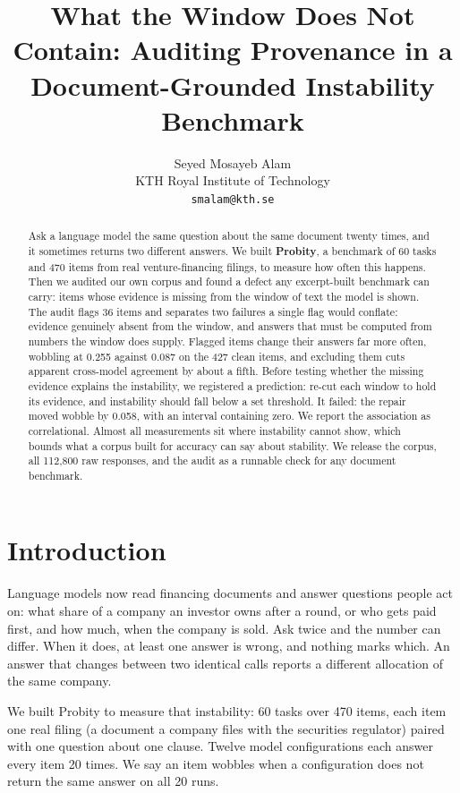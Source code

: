 \documentclass[11pt]{article}
\title{What the Window Does Not Contain: Auditing Provenance in a\\Document-Grounded Instability Benchmark}
\author{Seyed Mosayeb Alam \\
  KTH Royal Institute of Technology \\
  \texttt{smalam@kth.se}}
\begin{document}
\maketitle

\begin{abstract}
Ask a language model the same question about the same document twenty times, and it sometimes
returns two different answers. We built \textbf{Probity}, a benchmark of 60 tasks and 470 items from
real venture-financing filings, to measure how often this happens. Then we audited our own corpus
and found a defect any excerpt-built benchmark can carry: items whose evidence is missing from the
window of text the model is shown. The audit flags 36 items and separates two failures a single
flag would conflate: evidence genuinely absent from the window, and answers that must be computed
from numbers the window does supply. Flagged items change their answers far more often, wobbling at
0.255 against 0.087 on the 427 clean items, and excluding them cuts apparent cross-model agreement
by about a fifth. Before testing whether the missing evidence explains the instability, we
registered a prediction: re-cut each window to hold its evidence, and instability should fall below
a set threshold. It failed: the repair moved wobble by 0.058, with an interval containing zero. We
report the association as correlational. Almost all measurements sit where instability cannot show, which
bounds what a corpus built for accuracy can say about stability. We release the corpus, all
112{,}800 raw responses, and the audit as a runnable check for any document benchmark.
\end{abstract}

\section{Introduction}

Language models now read financing documents and answer questions people act on: what share of a
company an investor owns after a round, or who gets paid first, and how much, when the company is
sold. Ask twice and the number can differ. When it does, at least one answer is wrong, and nothing
marks which. An answer that changes between two identical calls reports a different
allocation of the same company.

We built Probity to measure that instability: 60 tasks over 470 items, each item one real filing (a
document a company files with the securities regulator) paired with one question about one clause.
Twelve model configurations each answer every item 20 times. We say an item wobbles when a
configuration does not return the same answer on all 20 runs.
\end{document}
